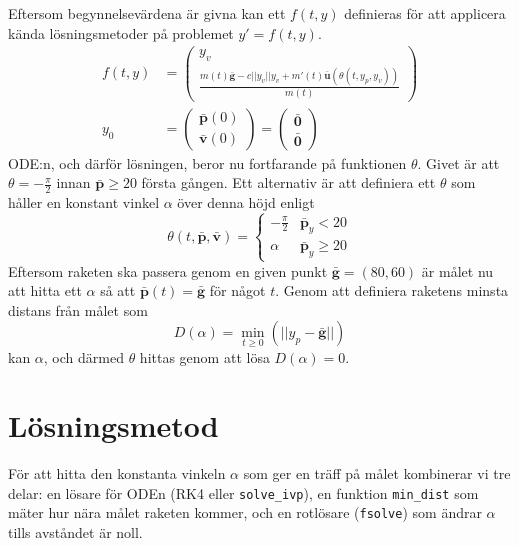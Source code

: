 \documentclass{article}
\newcommand{\bfbar}[1]{\ensuremath{\mathbf{\bar{#1}}}}
\begin{document}
Eftersom begynnelsevärdena är givna kan ett \(f(t, y)\) definieras för att applicera kända lösningsmetoder på problemet \(y'=f(t, y)\).
\[
    \begin{aligned}
        f(t, y) & = \begin{pmatrix}
                        y_v \\
                        \frac{m(t) \bfbar{g} - c||y_v||y_v + m'(t) \bfbar{u}(\theta(t, y_p, y_v))}{m(t)}
                    \end{pmatrix} \\
        y_0     & = \begin{pmatrix}
                        \bfbar{p}(0) \\
                        \bfbar{v}(0)
                    \end{pmatrix}
        = \begin{pmatrix}
              \bfbar{0} \\
              \bfbar{0}
          \end{pmatrix}
    \end{aligned}
\]
ODE:n, och därför lösningen, beror nu fortfarande på funktionen \(\theta\). Givet är att \(\theta = -\frac{\pi}{2}\) innan \(\bfbar{p} \geq 20\) första gången. Ett alternativ är att definiera ett \(\theta\) som håller en konstant vinkel \(\alpha\) över denna höjd enligt
\[
    \theta(t, \bfbar{p}, \bfbar{v}) = \begin{cases}
        -\frac{\pi}{2} & \bfbar{p}_y < 20    \\
        \alpha         & \bfbar{p}_y \geq 20
    \end{cases}
\]
Eftersom raketen ska passera genom en given punkt \(\bfbar{g} = (80, 60)\) är målet nu att hitta ett \(\alpha\) så att \(\bfbar{p}(t) = \bfbar{g}\) för något \(t\). Genom att definiera raketens minsta distans från målet som
\[
    D(\alpha) = \min_{t \geq 0}\left(||y_p - \bfbar{g}||\right)
\]
kan \(\alpha\), och därmed \(\theta\) hittas genom att lösa \(D(\alpha) = 0\).

\section{Lösningsmetod}
För att hitta den konstanta vinkeln \(\alpha\) som ger en träff på målet kombinerar vi tre delar: en lösare för ODEn (RK4 eller \texttt{solve\_ivp}), en funktion \texttt{min\_dist} som mäter hur nära målet raketen kommer, och en rotlösare (\texttt{fsolve}) som ändrar \(\alpha\) tills avståndet är noll.
\end{document}

